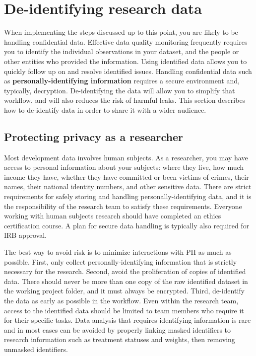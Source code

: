 \section{De-identifying research data}

When implementing the steps discussed up to this point,
you are likely to be handling confidential data.
Effective data quality monitoring
frequently requires you to identify the individual observations in your dataset,
and the people or other entities who provided the information.
Using identified data allows you to quickly follow up on and resolve identified issues.
Handling confidential data such as \textbf{personally-identifying information}
requires a secure environment and, typically, decryption.
De-identifying the data will allow you to simplify that workflow,
and will also reduces the risk of harmful leaks.
This section describes how to de-identify data in order to share it with a wider audience.

\subsection{Protecting privacy as a researcher}

Most development data involves human subjects.
As a researcher, you may have access to personal information about your subjects:
where they live, how much income they have,
whether they have committed or been victims of crimes,
their names, their national identity numbers, and other sensitive data.
There are strict requirements for safely storing and handling personally-identifying data,
and it is the responsibility of the research team to satisfy these requirements.
Everyone working with human subjects research should 
have completed an ethics certification course.
A plan for secure data handling is typically also required for IRB approval.

The best way to avoid risk is to minimize interactions with PII as much as possible.
First, only collect personally-identifying information that is strictly necessary for the research.
Second, avoid the proliferation of copies of identified data.
There should never be more than one copy of the raw identified dataset in the working project folder,
and it must always be encrypted.
Third, de-identify the data as early as possible in the workflow.
Even within the research team,
access to the identified data should be limited to team members who require it for their specific tasks.
Data analysis that requires identifying information is rare
and in most cases can be avoided by properly linking masked identifiers to research information
such as treatment statuses and weights, then removing unmasked identifiers.

